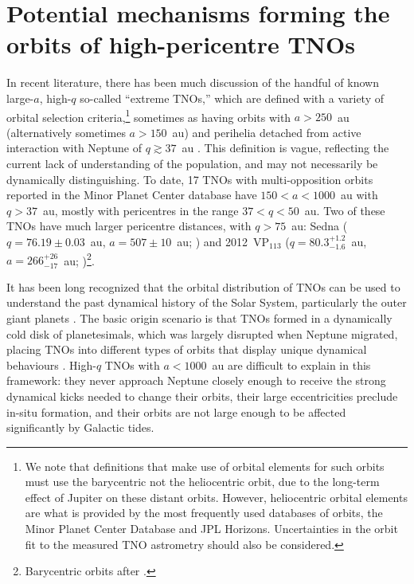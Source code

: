 \documentclass[preprint]{aastex62}
\begin{document}
\section{Potential mechanisms forming the orbits of high-pericentre TNOs} \label{sec:highq}

In recent literature, there has been much discussion of the handful of known large-$a$, high-$q$ so-called ``extreme TNOs,'' which are defined with a variety of orbital selection criteria,\footnote{We note that definitions that make use of orbital elements for such orbits must use the barycentric not the heliocentric orbit, due to the long-term effect of Jupiter on these distant orbits.
However, heliocentric orbital elements are what is provided by the most frequently used databases of orbits, the Minor Planet Center Database and JPL Horizons. Uncertainties in the orbit fit to the measured TNO astrometry should also be considered.}  sometimes as having orbits with $a>250$~au (alternatively sometimes $a>150$~au) and perihelia detached from active interaction with Neptune of $q\gtrsim37$~au \citep[e.g.][]{Kiss13,Sheppardetal2016,dlfmdlfm16c,shankman17bias,bannister17,becker18}.
This definition is vague, reflecting the current lack of understanding of the population, and may not necessarily be dynamically distinguishing. 
To date, 17 TNOs with multi-opposition orbits reported in the Minor Planet Center database have $150<a<1000$~au with $q>37$~au, mostly with pericentres in the range $37<q<50$~au.
Two of these TNOs have much larger pericentre distances, with $q>75$~au: Sedna ($q=76.19 \pm 0.03$~au, $a=507 \pm 10$~au; \citealt{brownetal04}) and 2012~VP$_{113}$ ($q=80.3^{+1.2}_{-1.6}$~au, $a = 266^{+26}_{-17}$~au; \citealt{trujillosheppard14})\footnote{Barycentric orbits after \citet{bannister17}.}. 

It has been long recognized that the orbital distribution of TNOs can be used to understand the past dynamical history of the Solar System, particularly the outer giant planets \citep{malhotra93,levison08}.
The basic origin scenario is that TNOs formed in a dynamically cold disk of planetesimals, which was largely disrupted when Neptune migrated, placing TNOs into different types of orbits that display unique dynamical behaviours \citep[see][]{gladman08}.  
High-$q$ TNOs with $a<1000$~au are difficult to explain in this framework: they never approach Neptune closely enough to receive the strong dynamical kicks needed to change their orbits, their large eccentricities preclude in-situ formation, and their orbits are not large enough to be affected significantly by Galactic tides.  
\end{document}
